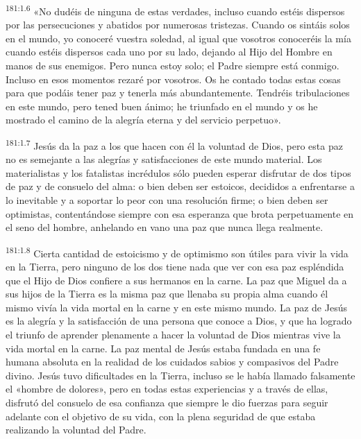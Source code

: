 \par 
\textsuperscript{181:1.6} «No dudéis de ninguna de estas verdades, incluso cuando estéis dispersos por las persecuciones y abatidos por numerosas tristezas. Cuando os sintáis solos en el mundo, yo conoceré vuestra soledad, al igual que vosotros conoceréis la mía cuando estéis dispersos cada uno por su lado, dejando al Hijo del Hombre en manos de sus enemigos. Pero nunca estoy solo; el Padre siempre está conmigo. Incluso en esos momentos rezaré por vosotros. Os he contado todas estas cosas para que podáis tener paz y tenerla más abundantemente. Tendréis tribulaciones en este mundo, pero tened buen ánimo; he triunfado en el mundo y os he mostrado el camino de la alegría eterna y del servicio perpetuo».

\par 
\textsuperscript{181:1.7} Jesús da la paz a los que hacen con él la voluntad de Dios, pero esta paz no es semejante a las alegrías y satisfacciones de este mundo material. Los materialistas y los fatalistas incrédulos sólo pueden esperar disfrutar de dos tipos de paz y de consuelo del alma: o bien deben ser estoicos, decididos a enfrentarse a lo inevitable y a soportar lo peor con una resolución firme; o bien deben ser optimistas, contentándose siempre con esa esperanza que brota perpetuamente en el seno del hombre, anhelando en vano una paz que nunca llega realmente.

\par 
\textsuperscript{181:1.8} Cierta cantidad de estoicismo y de optimismo son útiles para vivir la vida en la Tierra, pero ninguno de los dos tiene nada que ver con esa paz espléndida que el Hijo de Dios confiere a sus hermanos en la carne. La paz que Miguel da a sus hijos de la Tierra es la misma paz que llenaba su propia alma cuando él mismo vivía la vida mortal en la carne y en este mismo mundo. La paz de Jesús es la alegría y la satisfacción de una persona que conoce a Dios, y que ha logrado el triunfo de aprender plenamente a hacer la voluntad de Dios mientras vive la vida mortal en la carne. La paz mental de Jesús estaba fundada en una fe humana absoluta en la realidad de los cuidados sabios y compasivos del Padre divino. Jesús tuvo dificultades en la Tierra, incluso se le había llamado falsamente el «hombre de dolores», pero en todas estas experiencias y a través de ellas, disfrutó del consuelo de esa confianza que siempre le dio fuerzas para seguir adelante con el objetivo de su vida, con la plena seguridad de que estaba realizando la voluntad del Padre.

